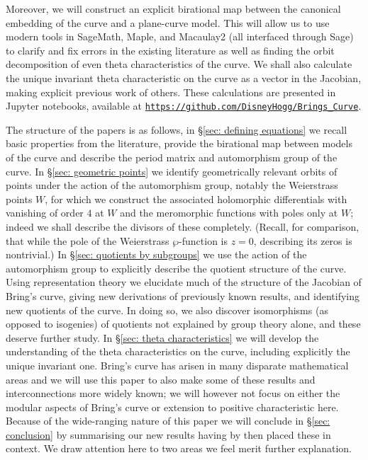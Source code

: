 \documentclass{amsart}
\begin{document}
Moreover, we will construct an explicit birational map between the canonical embedding of the curve and a plane-curve model. This will allow us to use modern tools in SageMath, Maple, and Macaulay2 (all interfaced through Sage) to clarify and fix errors in the existing literature as well as finding the orbit decomposition of even theta characteristics of the curve. We shall also calculate the unique invariant theta characteristic on the curve as a vector in the Jacobian, making explicit previous work of others. These calculations are presented in Jupyter notebooks, available at \href{https://github.com/DisneyHogg/Brings_Curve}{\tt{https://github.com/DisneyHogg/Brings\_Curve}}. 

The structure of the papers is as follows, in \S\ref{sec: defining equations} we recall basic properties from the literature, provide the birational map between models of the curve and describe the period matrix and automorphism group of the curve. In \S\ref{sec: geometric points} we identify geometrically relevant orbits of points under the action of the automorphism group, notably the Weierstrass points $W$, for which we construct the associated holomorphic differentials with vanishing of order $4$ at $W$ and the meromorphic functions with poles only at $W$; indeed we shall describe the divisors of these completely. (Recall, for comparison, that while the pole of the Weierstrass $\wp$-function
is $z=0$, describing its zeros is nontrivial.)
In \S\ref{sec: quotients by subgroups} we use the action of the automorphism group to explicitly describe the quotient structure of the curve.
Using representation theory we elucidate much of the structure of the Jacobian of Bring's curve, giving new derivations of previously known results, and identifying new quotients of the curve. In doing so, we also discover isomorphisms (as opposed to isogenies) of quotients not explained by group theory alone, and these deserve further study. In \S\ref{sec: theta characteristics} we will develop the understanding of the theta characteristics on the curve, including explicitly the unique invariant one. 
Bring's curve has arisen in many disparate mathematical areas and we will use this paper to also make some of these results and interconnections more widely known; we will however not focus on either the modular aspects of Bring's curve or extension to positive characteristic here. 
Because of the wide-ranging nature of this paper we will conclude in \S\ref{sec: conclusion} by summarising our new results having by then placed these in context. We draw attention here to two areas we feel merit further explanation.
\end{document}
